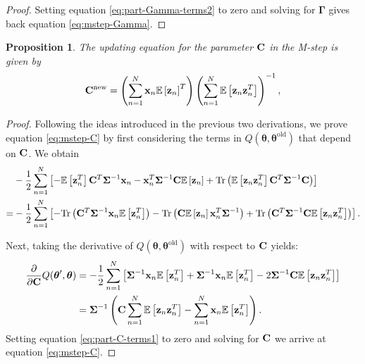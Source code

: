 \documentclass[11pt]{article}
\numberwithin{equation}{section}
\newcommand{\expectation}[1]{\mathbb{E}\left[#1\right]}
\newcommand{\Tr}[1]{\text{Tr}\left(#1\right)}
\newcommand{\x}{{\bf x}}
\newcommand{\z}{{\bf z}}
\newtheorem{proposition}{Proposition}[section]
\begin{document}
\begin{proof}
	Setting equation \eqref{eq:part-Gamma-terms2} to zero and solving for $\boldsymbol{\Gamma}$ gives back equation \eqref{eq:mstep-Gamma}.
\end{proof}

\begin{proposition}
	The updating equation for the parameter ${\bf C}$ in the M-step is given by
	\begin{align}
		{\bf C}^{\text{\normalfont new}} &= \left(\sum_{n=1}^N \x_n \expectation{\z_n}^T \right)\left(\sum_{n=1}^N \expectation{\z_n \z_n^T} \right)^{-1}, \label{eq:mstep-C}\\
	\end{align}
\end{proposition}

\begin{proof}
	Following the ideas introduced in the previous two derivations, we prove equation \ref{eq:mstep-C} by first considering the terms in $Q(\boldsymbol\theta, \boldsymbol\theta^\text{old})$ that depend on $\bf C$. We obtain
	\begin{align}
		& -\frac{1}{2}\sum_{n=1}^N \left[ -\expectation{\z_n^T} {\bf C}^T \boldsymbol{\Sigma}^{-1}\x_n - \x_n^T \boldsymbol{\Sigma}^{-1} {\bf C} \expectation{\z_n} + \text{Tr}\left(\expectation{\z_n\z_n^T}{\bf C}^T\boldsymbol\Sigma^{-1}{\bf C}\right)\right]\\
		=& -\frac{1}{2}\sum_{n=1}^N \left[ -\Tr{{\bf C}^T\boldsymbol{\Sigma}^{-1}\x_n \expectation{\z_n^T}} - \Tr{{\bf C}\expectation{\z_n}\x_n^T\boldsymbol{\Sigma}^{-1}} +  \Tr{{\bf C}^T\boldsymbol{\Sigma}^{-1}{\bf C}\expectation{\z_n\z_n^T}} \right].
	\end{align}
	
	Next, taking the derivative of $Q(\boldsymbol{\theta}, \boldsymbol{\theta}^{\text{old}})$ with respect to $\bf C$ yields:
	\begin{align}
		\frac{\partial}{\partial {\bf C}} Q(\boldsymbol{\theta}', \boldsymbol{\theta}) &= -\frac{1}{2}\sum_{n=1}^N \left[ \boldsymbol{\Sigma}^{-1} \x_n \expectation{\z_n^T} + \boldsymbol{\Sigma}^{-1}\x_n\expectation{\z_n^T} - 2 \boldsymbol{\Sigma}^{-1}{\bf C}\expectation{\z_n\z_n^T} \right] \\
		&= \boldsymbol{\Sigma}^{-1} \left( {\bf C} \sum_{n=1}^N \expectation{\z_n\z_n^T} - \sum_{n=1}^N\x_n\expectation{\z_n^T} \right). \label{eq:part-C-terms1}
	\end{align}
	Setting equation \eqref{eq:part-C-terms1} to zero and solving for $\bf C$ we arrive at equation \eqref{eq:mstep-C}.
\end{proof}
\end{document}
